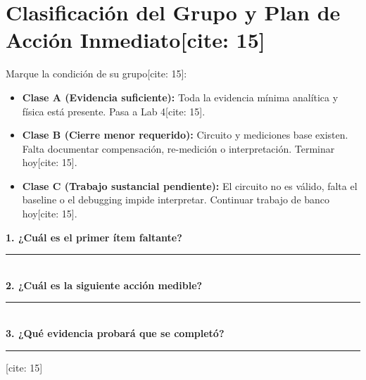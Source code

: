 \documentclass[11pt, a4paper]{article}
\begin{document}
\section*{Clasificación del Grupo y Plan de Acción Inmediato[cite: 15]}
Marque la condición de su grupo[cite: 15]:
\begin{itemize}
    \item[$\square$] \textbf{Clase A (Evidencia suficiente):} Toda la evidencia mínima analítica y física está presente. Pasa a Lab 4[cite: 15].
    \item[$\square$] \textbf{Clase B (Cierre menor requerido):} Circuito y mediciones base existen. Falta documentar compensación, re-medición o interpretación. Terminar hoy[cite: 15].
    \item[$\square$] \textbf{Clase C (Trabajo sustancial pendiente):} El circuito no es válido, falta el baseline o el debugging impide interpretar. Continuar trabajo de banco hoy[cite: 15].
\end{itemize}

\vspace{0.3cm}
\textbf{1. ¿Cuál es el primer ítem faltante?} \rule{10cm}{0.4pt} \\
\textbf{2. ¿Cuál es la siguiente acción medible?} \rule{9cm}{0.4pt} \\
\textbf{3. ¿Qué evidencia probará que se completó?} \rule{8cm}{0.4pt}[cite: 15]
\end{document}
